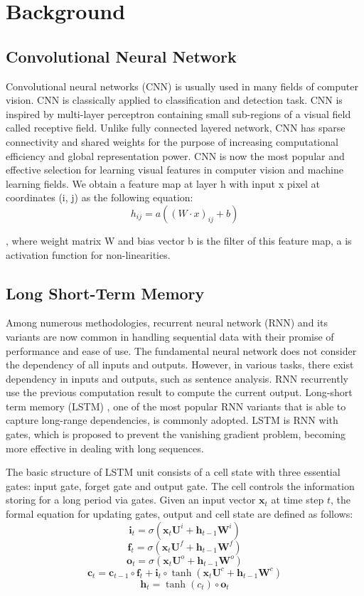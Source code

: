 \section{Background}
\subsection{Convolutional Neural Network}

Convolutional neural networks (CNN) is usually used in many fields of computer vision. CNN is classically applied to classification and detection task.
CNN is inspired by multi-layer perceptron containing small sub-regions of a visual field called receptive field. 
Unlike fully connected layered network, CNN has sparse connectivity and shared weights for the purpose
of increasing computational efficiency and global representation power. CNN is now the most popular and effective selection for learning visual features in computer vision and machine learning fields. We obtain a feature map at layer h with input x pixel at coordinates (i, j) as the following equation:
\begin{equation}
h_{ij} = a((W \cdot x)_{ij}+b)
\end{equation}

, where weight matrix W and bias vector b is the filter of this feature map, a is activation function for non-linearities.
    
\subsection{Long Short-Term Memory}

Among numerous methodologies, recurrent neural network (RNN) and its variants are now common in handling sequential data with their promise of performance and ease of use. The fundamental neural network does not consider the dependency of all inputs and outputs. However, in various tasks, there exist dependency in inputs and outputs, such as sentence analysis. RNN recurrently use the previous computation result to compute the current output. Long-short term memory (LSTM) \cite{hochreiter1997long}, one of the most popular RNN variants that is able to capture long-range dependencies, is commonly adopted. LSTM is RNN with gates, which is proposed to prevent the vanishing gradient problem, becoming more effective in dealing with long sequences.

The basic structure of LSTM unit consists of a cell state with three essential gates: input gate, forget gate and output gate. The cell controls the information storing for a long period via gates. Given an input vector $\mathbf x_t$ at time step $t$, the formal equation for updating gates, output and cell state are defined as follows:
$$\mathbf i_t=\sigma\left({\mathbf x}_{t}{\mathbf U}^{i} + {\mathbf 
	h}_{t-1}{\mathbf W}^{i}\right)$$
$$\mathbf f_t=\sigma\left({\mathbf x}_{t}{\mathbf U}^{f} + {\mathbf 
	h}_{t-1}{\mathbf W}^{f}\right)$$
$$\mathbf o_t=\sigma\left({\mathbf x}_{t}{\mathbf U}^{o} + {\mathbf 
	h}_{t-1}{\mathbf W}^{o}\right)$$
$$\mathbf c_t=\mathbf c_{t-1}\circ \mathbf f_t + \mathbf i_t\circ 
\tanh\left({\mathbf x}_{t}{\mathbf U}^{c} + {\mathbf h}_{t-1}{\mathbf 
	W}^{c}\right)$$
$$\mathbf h_t=\tanh\left(c_t\right)\circ \mathbf o_t$$


